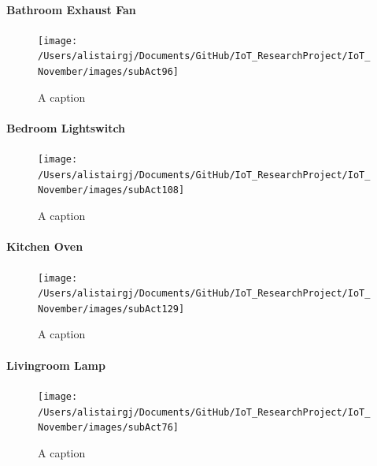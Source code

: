 \documentclass[11pt,]{article}
\let\oldparagraph\paragraph
\renewcommand{\paragraph}[1]{\oldparagraph{#1}\mbox{}}
\begin{document}
\hypertarget{bathroom-exhaust-fan}{%
\paragraph{Bathroom Exhaust Fan}\label{bathroom-exhaust-fan}}

\begin{figure}[H]

{\centering \texttt{[image: /Users/alistairgj/Documents/GitHub/IoT\_ResearchProject/IoT\_November/images/subAct96]} 

}

\caption{A caption}\label{fig:subAct96}
\end{figure}

\hypertarget{bedroom-lightswitch}{%
\paragraph{Bedroom Lightswitch}\label{bedroom-lightswitch}}

\begin{figure}[H]

{\centering \texttt{[image: /Users/alistairgj/Documents/GitHub/IoT\_ResearchProject/IoT\_November/images/subAct108]} 

}

\caption{A caption}\label{fig:subAct108}
\end{figure}

\hypertarget{kitchen-oven}{%
\paragraph{Kitchen Oven}\label{kitchen-oven}}

\begin{figure}[H]

{\centering \texttt{[image: /Users/alistairgj/Documents/GitHub/IoT\_ResearchProject/IoT\_November/images/subAct129]} 

}

\caption{A caption}\label{fig:subAct129}
\end{figure}

\hypertarget{livingroom-lamp}{%
\paragraph{Livingroom Lamp}\label{livingroom-lamp}}

\begin{figure}[H]

{\centering \texttt{[image: /Users/alistairgj/Documents/GitHub/IoT\_ResearchProject/IoT\_November/images/subAct76]} 

}

\caption{A caption}\label{fig:subAct76}
\end{figure}
\end{document}
